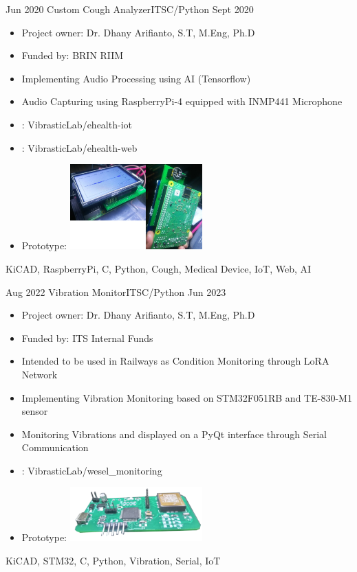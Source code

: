 \begin{experiences}
    \emptySeparator
	\experience
    {Jun 2020} {Custom Cough Analyzer}{ITS}{C/Python}
	{Sept 2020} {
	\begin{itemize}
            \item Project owner: Dr. Dhany Arifianto, S.T, M.Eng, Ph.D
            \item Funded by: BRIN RIIM
	        \item Implementing Audio Processing using AI (Tensorflow)
	        \item Audio Capturing using RaspberryPi-4 equipped with INMP441 Microphone
	        \item \faGithub:  {VibrasticLab/ehealth-iot}
	        \item \faGithub:  {VibrasticLab/ehealth-web}
            \item Prototype: \includegraphics[width=0.4\textwidth]{images/cough.jpg}
	\end{itemize}
    }
    {KiCAD, RaspberryPi, C, Python, Cough, Medical Device, IoT, Web, AI}

    \emptySeparator
	\experience
    {Aug 2022} {Vibration Monitor}{ITS}{C/Python}
	{Jun 2023} {
	\begin{itemize}
            \item Project owner: Dr. Dhany Arifianto, S.T, M.Eng, Ph.D
            \item Funded by: ITS Internal Funds
            \item Intended to be used in Railways as Condition Monitoring through LoRA Network
	        \item Implementing Vibration Monitoring based on STM32F051RB and TE-830-M1 sensor
	        \item Monitoring Vibrations and displayed on a PyQt interface through Serial Communication
	    \item \faGithub:  {VibrasticLab/wesel\_monitoring}
        \item Prototype: \includegraphics[width=0.4\textwidth]{images/vibs.png}
	\end{itemize}
    }
    {KiCAD, STM32, C, Python, Vibration, Serial, IoT}


\end{experiences}

